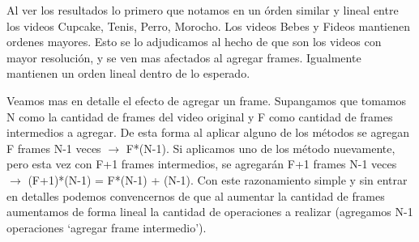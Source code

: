 \begin{figure}[ht]
	\begin{center}
	\end{center}
\end{figure}
\FloatBarrier

\par Al ver los resultados lo primero que notamos en un \'orden similar y lineal entre los videos Cupcake, Tenis, Perro, Morocho. Los videos Bebes y Fideos mantienen ordenes mayores. Esto se lo adjudicamos al hecho de que son los videos con mayor resoluci\'on, y se ven mas afectados al agregar frames. Igualmente mantienen un orden lineal dentro de lo esperado.

\par Veamos mas en detalle el efecto de agregar un frame. Supangamos que tomamos N como la cantidad de frames del video original y F como cantidad de frames intermedios a agregar. De esta forma al aplicar alguno de los m\'etodos se agregan F frames N-1 veces $\longrightarrow$ F*(N-1). Si aplicamos uno de los m\'etodo nuevamente, pero esta vez con F+1 frames intermedios, se agregar\'an F+1 frames N-1 veces $\longrightarrow$ (F+1)*(N-1) = F*(N-1) + (N-1). Con este razonamiento simple y sin entrar en detalles podemos convencernos de que al aumentar la cantidad de frames aumentamos de forma lineal la cantidad de operaciones a realizar (agregamos N-1 operaciones `agregar frame intermedio').